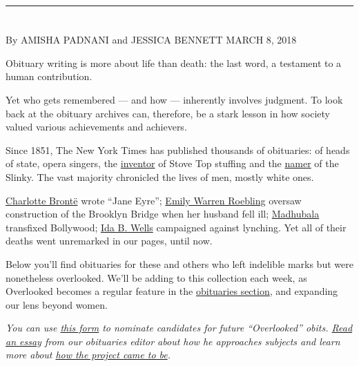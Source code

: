 \begin{center}\rule{0.5\linewidth}{\linethickness}\end{center}

\section{}

By AMISHA PADNANI and JESSICA BENNETT MARCH 8, 2018

Obituary writing is more about life than death: the last word, a
testament to a human contribution.

Yet who gets remembered --- and how --- inherently involves judgment. To
look back at the obituary archives can, therefore, be a stark lesson in
how society valued various achievements and achievers.

Since 1851, The New York Times has published thousands of obituaries: of
heads of state, opera singers, the
\href{https://www.nytimes3xbfgragh.onion/2005/11/23/us/ruth-m-siems-inventor-of-stuffing-dies-at-74.html}{inventor}
of Stove Top stuffing and the
\href{https://www.nytimes3xbfgragh.onion/2008/11/25/business/25james.html}{namer}
of the Slinky. The vast majority chronicled the lives of men, mostly
white ones.

\href{https://www.nytimes3xbfgragh.onion/2018/03/08/obituaries/overlooked-charlotte-bronte.html}{Charlotte
Brontë} wrote ``Jane Eyre'';
\href{https://www.nytimes3xbfgragh.onion}{Emily Warren Roebling} oversaw
construction of the Brooklyn Bridge when her husband fell ill;
\href{https://www.nytimes3xbfgragh.onion}{Madhubala} transfixed
Bollywood; \href{https://www.nytimes3xbfgragh.onion}{Ida B. Wells}
campaigned against lynching. Yet all of their deaths went unremarked in
our pages, until now.

Below you'll find obituaries for these and others who left indelible
marks but were nonetheless overlooked. We'll be adding to this
collection each week, as Overlooked becomes a regular feature in the
\href{https://www.nytimes3xbfgragh.onion/section/obituaries}{obituaries
section}, and expanding our lens beyond women.

\emph{You can use
\href{https://www.nytimes3xbfgragh.onion/interactive/2018/obituaries/formacist-overlooked.html}{this
form} to nominate candidates for future ``Overlooked'' obits.
\href{https://www.nytimes3xbfgragh.onion/2018/03/08/obituaries/overlooked-from-the-death-desk-why-most-obits-are-still-of-white-men.html}{Read
an essay} from our obituaries editor about how he approaches subjects
and learn more about
\href{https://www.nytimes3xbfgragh.onion/2018/03/08/insider/overlooked-obituary.html}{how
the project came to be}.}


